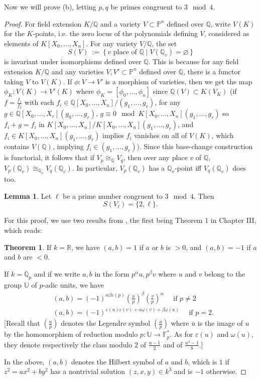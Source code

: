 \documentclass{article}
\theoremstyle{customplain}
\theoremstyle{customdef}
\newcommand{\leg}[2]{\genfrac{(}{)}{}{}{#1}{#2}} %
\newcommand{\R}{\mathbb{R}}
\newcommand{\Q}{\mathbb{Q}}
\newcommand{\F}{\mathbb{F}}
\renewcommand{\P}{\mathbb{P}}
\newcommand{\eps}{\varepsilon}
\let\emptyset\varnothing
\theoremstyle{definition} %
\newtheorem*{lemma*}{Lemma}
\newtheorem*{theorem*}{Theorem}
\begin{document}
Now we will prove (b), letting $p,q$ be primes congruent to $3\mod 4$.
\begin{proof}

For field extension $K/\Q$ and a variety $V\subset \P^n$ defined over $\Q$, write $V(K)$ for the $K$-points, i.e. the zero locus of the polynomials defining $V$, considered as elements of $K[X_0, \dots, X_n]$. For any variety $V/\Q$, the set
\[
S(V)\ :=\ \{\,v \text{ place of }\Q \mid V(\Q_v)=\emptyset\,\}
\]
is invariant under isomorphisms defined over $\Q$. This is because for any field extension $K/\Q$ and any varieties $V,V'\subset \P^n$ defined over $\Q$, there is a functor taking $V$ to $V(K)$. If $\phi:V\to V'$ is a morphism of varieties, then we get the map $\phi_K:V(K)\to V'(K)$ where $\phi_K = [\phi_0, \dots, \phi_n]$ since $\Q(V)\subset K(V_K)$ (if $f=\frac{f_1}{f_2}$ with each $f_i\in \Q[X_0, \dots, X_n]/(g_1, \dots, g_r)$, for any $g \in \Q[X_0,\dots,X_r](g_0, \dots, g_r)$, $g\equiv 0 \mod K[X_0, \dots, X_n](g_1, \dots, g_r)$ so $f_i+g=f_i$ in $K[X_0, \dots, X_n]/K[X_0, \dots, X_n](g_1, \dots, g_r)$, and $f_i \in K[X_0, \dots, X_n](g_1, \dots, g_r)$ implies $f_i$ vanishes on all of $V(K)$, which contains $V(\Q)$, implying $f_i\in (g_1, \dots, g_r)$). Since this base-change construction is functorial, it follows that if $V_p \cong_\Q V_q$, then over any place $v$ of $\Q$, $V_p(\Q_v) \cong_{\Q_v} V_q(\Q_v).$ In particular, $V_p(\Q_v)$ has a $\Q_v$-point iff $V_q(\Q_v)$ does too.

\begin{lemma*}
    Let $\ell$ be a prime number congruent to $3\mod 4$. Then $$S(V_\ell)=\{2,\ell\}.$$
\end{lemma*}
For this proof, we use two results from \cite{CourseArithmetic}, the first being Theorem 1 in Chapter III, which reads:
    \begin{theorem*}
        If $k=\R$, we have $(a,b)=1$ if $a$ or $b$ is $>0$, and $(a,b)=-1$ if $a$ and $b$ are $<0$.

        If $k=\Q_p$ and if we write $a,b$ in the form $p^\alpha u, p^\beta v$ where $u$ and $v$ belong to the group $\mathbb{U}$ of $p$-adic units, we have
        \begin{align*}
            &(a,b)=(-1)^{\alpha \beta \eps(p)} \leg{u}{p}^\beta \leg{v}{p}^\alpha \quad \text{ if } p\ne 2\\
            &(a,b) = (-1)^{\eps(u)\eps(v)+\alpha\omega(v)+\beta\omega(u)} \quad \text{ if } p=2.
        \end{align*}
        [Recall that $\leg{u}{p}$ denotes the Legendre symbol $\leg{\bar u}{p}$ where $\bar u$ is the image of $u$ by the homomorphism of reduction modulo $p:\mathbb{U}\to \F_p^*.$ As for $\eps(u)$ and $\omega(u)$, they denote respectively the class modulo $2$ of $\frac{u-1}{2}$ and of $\frac{u^2-1}{8}$.]
    \end{theorem*}
    In the above, $(a,b)$ denotes the Hilbert symbol of $a$ and $b$, which is $1$ if $z^2=ax^2+by^2$ has a nontrivial solution $(z,x,y)\in k^3$ and is $-1$ otherwise.


\end{proof}
\end{document}
